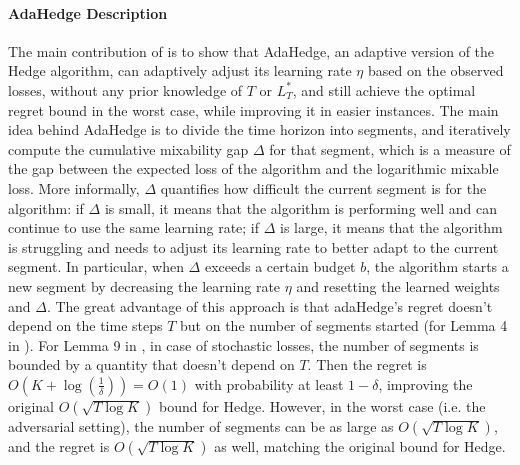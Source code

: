 \documentclass{article}
\begin{document}
\paragraph{AdaHedge Description}
The main contribution of \cite{ADA_HEDGE} is to show that AdaHedge, an adaptive version of the Hedge algorithm, 
can adaptively adjust its learning rate $\eta$ based on the observed losses, without any prior knowledge of $T$ or $L_T^*$, 
and still achieve the optimal regret bound in the worst case, while improving it in easier instances.
The main idea behind AdaHedge is to divide the time horizon into segments,
and iteratively compute the cumulative mixability gap $\Delta$ for that segment, 
which is a measure of the gap between the expected loss of the algorithm and the logarithmic mixable loss.
More informally, $\Delta$ quantifies how difficult the current segment is for the algorithm: 
if $\Delta$ is small, it means that the algorithm is performing well and can continue to use the same learning rate; 
if $\Delta$ is large, it means that the algorithm is struggling and needs to adjust its learning rate to better adapt to the current segment.
In particular, when $\Delta$ exceeds a certain budget $b$, the algorithm starts a new segment by decreasing the learning rate $\eta$ and
resetting the learned weights and $\Delta$.
The great advantage of this approach is that adaHedge's regret doesn't depend on the time steps $T$ 
but on the number of segments started (for Lemma 4 in \cite{ADA_HEDGE}).
For Lemma 9 in \cite{ADA_HEDGE}, in case of stochastic losses, 
the number of segments is bounded by a quantity that doesn't depend on $T$. Then the regret is $O(K + \log(\frac{1}{\delta})) = O(1)$ with probability 
at least $1-\delta$, improving the original $O(\sqrt{T \log K})$ bound for Hedge.
However, in the worst case (i.e. the adversarial setting), the number of segments can be as large as $O(\sqrt{T \log K})$, 
and the regret is $O(\sqrt{T \log K})$ as well, matching the original bound for Hedge.
\end{document}
